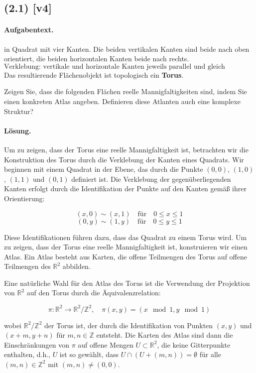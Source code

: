 \documentclass[11pt,a4paper]{article}
\begin{document}
\subsection*{(2.1) [v4]}
\paragraph{Aufgabentext.}
in Quadrat mit vier Kanten. 
Die beiden vertikalen Kanten sind beide nach oben orientiert, 
die beiden horizontalen Kanten beide nach rechts.  
\[
\text{Verklebung: vertikale und horizontale Kanten jeweils parallel und gleich orientiert.}
\]
Das resultierende Flächenobjekt ist topologisch ein \textbf{Torus}.

Zeigen Sie, dass die folgenden Flächen reelle Mannigfaltigkeiten sind, indem Sie einen konkreten Atlas angeben. Definieren diese Atlanten auch eine komplexe Struktur?

\paragraph{Lösung.}
Um zu zeigen, dass der Torus eine reelle Mannigfaltigkeit ist, betrachten wir die Konstruktion des Torus durch die Verklebung der Kanten eines Quadrats. Wir beginnen mit einem Quadrat in der Ebene, das durch die Punkte \( (0,0) \), \( (1,0) \), \( (1,1) \) und \( (0,1) \) definiert ist. Die Verklebung der gegenüberliegenden Kanten erfolgt durch die Identifikation der Punkte auf den Kanten gemäß ihrer Orientierung:

\[
(x,0) \sim (x,1) \quad \text{für} \quad 0 \leq x \leq 1
\]
\[
(0,y) \sim (1,y) \quad \text{für} \quad 0 \leq y \leq 1
\]

Diese Identifikationen führen dazu, dass das Quadrat zu einem Torus wird. Um zu zeigen, dass der Torus eine reelle Mannigfaltigkeit ist, konstruieren wir einen Atlas. Ein Atlas besteht aus Karten, die offene Teilmengen des Torus auf offene Teilmengen des \(\mathbb{R}^2\) abbilden.

Eine natürliche Wahl für den Atlas des Torus ist die Verwendung der Projektion von \(\mathbb{R}^2\) auf den Torus durch die Äquivalenzrelation:

\[
\pi: \mathbb{R}^2 \to \mathbb{R}^2 / \mathbb{Z}^2, \quad \pi(x,y) = (x \mod 1, y \mod 1)
\]

wobei \(\mathbb{R}^2 / \mathbb{Z}^2\) der Torus ist, der durch die Identifikation von Punkten \((x,y)\) und \((x+m, y+n)\) für \(m, n \in \mathbb{Z}\) entsteht. Die Karten des Atlas sind dann die Einschränkungen von \(\pi\) auf offene Mengen \(U \subset \mathbb{R}^2\), die keine Gitterpunkte enthalten, d.h., \(U\) ist so gewählt, dass \(U \cap (U + (m,n)) = \emptyset\) für alle \((m,n) \in \mathbb{Z}^2\) mit \((m,n) \neq (0,0)\).
\end{document}
